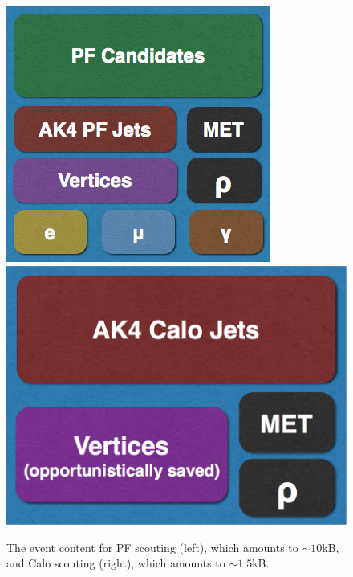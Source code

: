 \begin{figure}\centering
\includegraphics[width=.45\textwidth]{figs/cms/pfscoutingeventcontent.png}
\includegraphics[width=.45\textwidth]{figs/cms/caloscoutingeventcontent.png}
\caption{The event content for PF scouting (left), which amounts to
  $\sim 10$\unit{kB}, and Calo scouting (right), which amounts to
  $\sim 1.5$\unit{kB}.\label{fig:DataScoutingContent}}
\end{figure}
